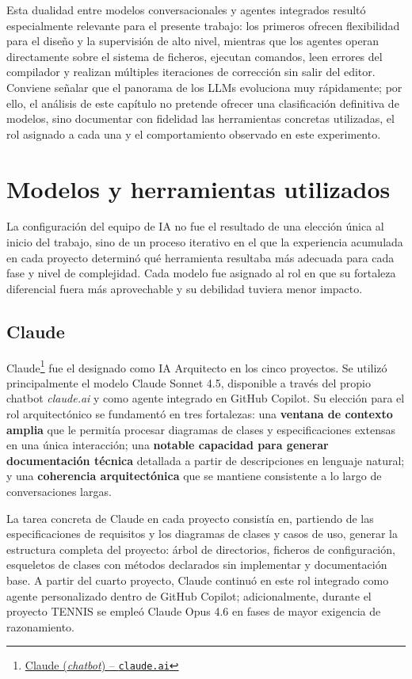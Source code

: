 Esta dualidad entre modelos conversacionales y agentes integrados resultó especialmente relevante para el presente trabajo: los primeros ofrecen flexibilidad para el diseño y la supervisión de alto nivel, mientras que los agentes operan directamente sobre el sistema de ficheros, ejecutan comandos, leen errores del compilador y realizan múltiples iteraciones de corrección sin salir del editor. Conviene señalar que el panorama de los \ac{LLMs} evoluciona muy rápidamente; por ello, el análisis de este capítulo no pretende ofrecer una clasificación definitiva de modelos, sino documentar con fidelidad las herramientas concretas utilizadas, el rol asignado a cada una y el comportamiento observado en este experimento.

\section{Modelos y herramientas utilizados} \label{sec:models-description}

La configuración del equipo de \ac{IA} no fue el resultado de una elección única al inicio del trabajo, sino de un proceso iterativo en el que la experiencia acumulada en cada proyecto determinó qué herramienta resultaba más adecuada para cada fase y nivel de complejidad.
Cada modelo fue asignado al rol en que su fortaleza diferencial fuera más aprovechable y su debilidad tuviera menor impacto.

\subsection{Claude} \label{subsec:claude}

Claude\footnote{\href{https://claude.ai}{Claude (\textit{chatbot}) -- \texttt{claude.ai}}} fue el designado como \ac{IA} Arquitecto en los cinco proyectos. Se utilizó principalmente el modelo Claude Sonnet 4.5, disponible a través del propio chatbot \textit{claude.ai} y como agente integrado en GitHub Copilot. Su elección para el rol arquitectónico se fundamentó en tres fortalezas: una \textbf{ventana de contexto amplia} que le permitía procesar diagramas de clases y especificaciones extensas en una única interacción; una \textbf{notable capacidad para generar documentación técnica} detallada a partir de descripciones en lenguaje natural; y una \textbf{coherencia arquitectónica} que se mantiene consistente a lo largo de conversaciones largas.

La tarea concreta de Claude en cada proyecto consistía en, partiendo de las especificaciones de requisitos y los diagramas de clases y casos de uso, generar la estructura completa del proyecto: árbol de directorios, ficheros de configuración, esqueletos de clases con métodos declarados sin implementar y documentación base. A partir del cuarto proyecto, Claude continuó en este rol integrado como agente personalizado dentro de GitHub Copilot; adicionalmente, durante el proyecto \ac{TENNIS} se empleó Claude Opus 4.6 en fases de mayor exigencia de razonamiento.

